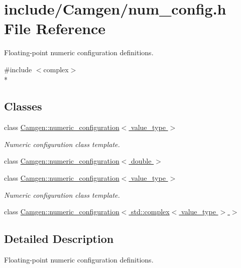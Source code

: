 \hypertarget{a00702}{}\section{include/\+Camgen/num\+\_\+config.h File Reference}
\label{a00702}


Floating-\/point numeric configuration definitions.  


{\ttfamily \#include $<$complex$>$}\\*
\subsection*{Classes}
\begin{DoxyCompactItemize}
\item 
class \hyperlink{a00386}{Camgen\+::numeric\+\_\+configuration$<$ value\+\_\+type $>$}
\begin{DoxyCompactList}\small\item\em Numeric configuration class template. \end{DoxyCompactList}\item 
class \hyperlink{a00387}{Camgen\+::numeric\+\_\+configuration$<$ double $>$}
\item 
class \hyperlink{a00386}{Camgen\+::numeric\+\_\+configuration$<$ value\+\_\+type $>$}
\begin{DoxyCompactList}\small\item\em Numeric configuration class template. \end{DoxyCompactList}\item 
class \hyperlink{a00388}{Camgen\+::numeric\+\_\+configuration$<$ std\+::complex$<$ value\+\_\+type $>$ $>$}
\end{DoxyCompactItemize}


\subsection{Detailed Description}
Floating-\/point numeric configuration definitions. 

